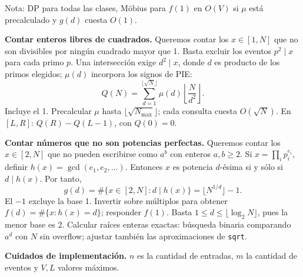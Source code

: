 Nota: DP para todas las clases, Möbius para $f(1)$ en $O(V)$ si $\mu$ está precalculado y $g(d)$ cuesta $O(1)$.


\begin{extended}
\textbf{Contar enteros libres de cuadrados.}
Queremos contar los $x\in[1,N]$ que no son divisibles por
ningún cuadrado mayor que 1. Basta excluir los eventos
$p^2\mid x$ para cada primo $p$. Una intersección exige
$d^2\mid x$, donde $d$ es producto de los primos elegidos;
$\mu(d)$ incorpora los signos de PIE:
\[
Q(N)=\sum_{d=1}^{\lfloor\sqrt N\rfloor}
\mu(d)\left\lfloor\frac{N}{d^2}\right\rfloor.
\]
Incluye el 1. Precalcular $\mu$ hasta
$\lfloor\sqrt{N_{\max}}\rfloor$; cada consulta cuesta
$O(\sqrt N)$. En $[L,R]$: $Q(R)-Q(L-1)$, con $Q(0)=0$.

\textbf{Contar números que no son potencias perfectas.}
Queremos contar los $x\in[2,N]$ que no pueden escribirse
como $a^b$ con enteros $a,b\ge2$. Si
$x=\prod_i p_i^{e_i}$, definir $h(x)=\gcd(e_1,e_2,\dots)$.
Entonces $x$ es potencia $d$-ésima si y sólo si
$d\mid h(x)$. Por tanto,
\[
g(d)=\#\{x\in[2,N]:d\mid h(x)\}
=\lfloor N^{1/d}\rfloor-1.
\]
El $-1$ excluye la base 1. Invertir sobre múltiplos para
obtener $f(d)=\#\{x:h(x)=d\}$; responder $f(1)$.
Basta $1\le d\le\lfloor\log_2N\rfloor$, pues la menor
base es 2. Calcular raíces enteras exactas: búsqueda
binaria comparando $a^d$ con $N$ sin overflow; ajustar
también las aproximaciones de \texttt{sqrt}.
\end{extended}

\textbf{Cuidados de implementación.}
$n$ es la cantidad de entradas, $m$ la cantidad de
eventos y $V,L$ valores máximos.